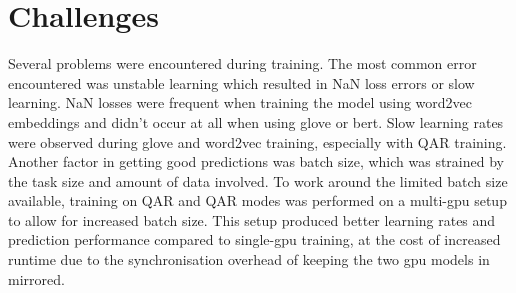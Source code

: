 \section{Challenges}
\label{sec:experiment-challenges}

Several problems were encountered during training.
The most common error encountered was unstable learning which resulted in NaN loss errors or slow learning.
NaN losses were frequent when training the model using word2vec embeddings and didn't occur at all when using glove or bert.
Slow learning rates were observed during glove and word2vec training, especially with Q\rightarrow{}AR training.
Another factor in getting good predictions was batch size, which was strained by the task size and amount of data involved.
To work around the limited batch size available, training on QA\rightarrow{}R and Q\rightarrow{}AR modes was performed on a multi-\gls{gpu} setup to allow for increased batch size.
This setup produced better learning rates and prediction performance compared to single-\gls{gpu} training, at the cost of increased runtime due to the synchronisation overhead of keeping the two \gls{gpu} models in mirrored.
